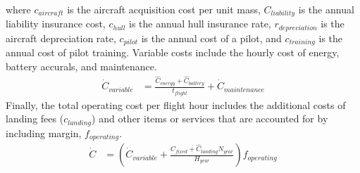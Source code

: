 \documentclass[12pt, letter]{article}
\begin{document}
where $c_{aircraft}$ is the aircraft acquisition cost per unit mass, $C_{liability}$ is the annual liability insurance cost, $c_{hull}$ is the annual hull insurance rate, $r_{depreciation}$ is the aircraft depreciation rate, $c_{pilot}$ is the annual cost of a pilot, and $c_{training}$ is the annual cost of pilot training. Variable costs include the hourly cost of energy, battery accurals, and maintenance.
\begin{align}
	\dot{C}_{variable}&=\frac{\hat{C}_{energy}+\hat{C}_{battery}}{t_{flight}}+\dot{C}_{maintenance}
\end{align}
Finally, the total operating cost per flight hour includes the additional costs of landing fees ($c_{landing}$) and other items or services that are accounted for by including margin, $f_{operating}$.
\begin{align}
	\dot{C}&=\left(\dot{C}_{variable}+\frac{C_{fixed}+\hat{C}_{landing}N_{year}}{H_{year}}\right)f_{operating}
\end{align}
\end{document}
